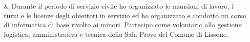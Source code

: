 & Durante il periodo di servizio civile ho organizzato le mansioni di lavoro, i turni e le licenze degli obiettori in servizio ed ho organizzato e condotto un corso di informatica di base rivolto ai minori. Partecipo come volontario alla gestione logistica, amministrativa e tecnica della Sala Prove del Comune di Lissone.\\